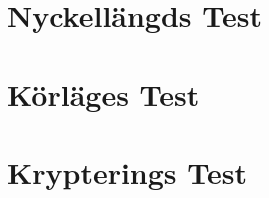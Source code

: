 \label{chap:resultat}
\section{Nyckellängds Test}
\label{sec:nyckellangd}

\section{Körläges Test}
\label{sec:korlages}

\section{Krypterings Test}
\label{sec:krypterings-test}
